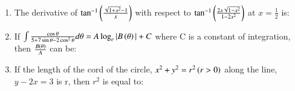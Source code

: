 \documentclass[journal,12pt,onecolumn]{IEEEtran}
\theoremstyle{remark}
\begin{document}
\begin{enumerate}
\begin{enumerate}
     \end{enumerate}
     \item The derivative of $\tan^{-1}\left(\frac{\sqrt{1+x^{2}}-1}{x}\right)$ with respect to $\tan^{-1}\left(\frac{2x\sqrt{1-x^{2}}}{1-2x^{2}}\right)$ at $x=\frac{1}{2}$ is:
     \begin{enumerate}
      \end{enumerate}
      \item If $\int \frac{\cos\theta}{5+7\sin\theta-2\cos^{2}\theta}d\theta= A\log_{e}|B\left(\theta\right)|+C$ where C is a constant of integration, then $\frac{B\left(\theta\right)}{A}$ can be:
      \begin{enumerate}
      \end{enumerate}
      \item If the length of the cord of the circle, $x^{2}+y^{2}=r^{2}\left(r>0\right)$ along the line, $y-2x=3$ is r, then $r^{2}$ is equal to:
      \begin{enumerate}
\end{enumerate}
\end{enumerate}
\end{document}
